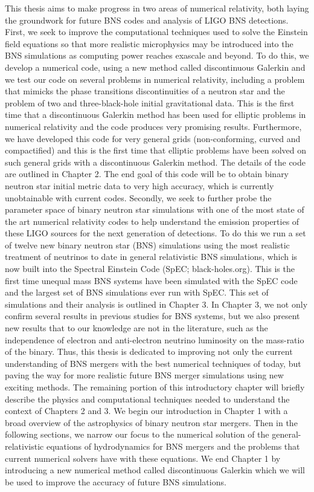 This thesis aims to make progress in two areas of numerical relativity, both laying the groundwork for future BNS codes and analysis of LIGO BNS detections. First, we seek to improve the computational techniques used to solve the Einstein field equations so that more realistic microphysics may be introduced into the BNS simulations as computing power reaches exascale and beyond. To do this, we develop a numerical code, using a new method called discontinuous Galerkin and we test our code on several problems in numerical relativity, including a problem that mimicks the phase transitions discontinuities of a neutron star and the problem of two and three-black-hole initial gravitational data. This is the first time that a discontinuous Galerkin method has been used for elliptic problems in numerical relativity  and the code produces very promising results. Furthermore, we have developed this code for very general grids (non-conforming, curved and compactified) and this is the first time that elliptic problems have been solved on such general grids with a discontinuous Galerkin method. The details of the code are outlined in Chapter 2. The end goal of this code will be to obtain binary neutron star initial metric data to very high accuracy, which is currently unobtainable with current codes. Secondly, we seek to further probe the parameter space of binary neutron star simulations with one of the most state of the art numerical relativity codes to help understand the emission properties of these LIGO sources for the next generation of detections. To do this we run a set of twelve new binary neutron star (BNS) simulations using the most realistic treatment of neutrinos to date in general relativistic BNS simulations, which is now built into the Spectral Einstein Code (SpEC; black-holes.org). This is the first time unequal mass BNS systems have been simulated with the SpEC code and the largest set of BNS simulations ever run with SpEC. This set of simulations and their analysis is outlined in Chapter 3. In Chapter 3, we not only confirm several results in previous studies for BNS systems, but we also present new results that to our knowledge are not in the literature, such as the independence of electron and anti-electron neutrino luminosity on the mass-ratio of the binary. Thus, this thesis is dedicated to improving not only the current understanding of BNS mergers with the best numerical techniques of today, but paving the way for more realistic future BNS merger simulations using new exciting methods. The remaining portion of this introductory chapter will briefly describe the physics and computational techniques needed to understand the context of Chapters 2 and 3.
We begin our introduction in Chapter 1 with a broad overview of the astrophysics of binary neutron star mergers. Then in the following sections, we narrow our focus to the numerical solution of the general-relativistic equations of hydrodynamics for BNS mergers and the problems that current numerical solvers have with these equations. We end Chapter 1 by introducing a new numerical method called discontinuous Galerkin which we will be used to improve the accuracy of future BNS simulations.

